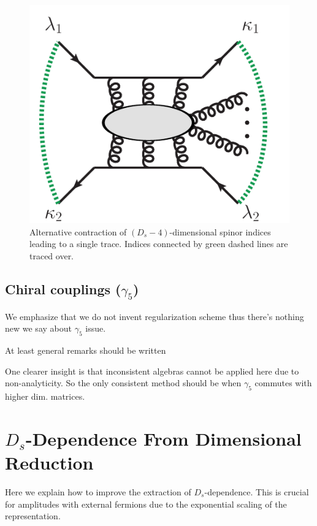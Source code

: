 \begin{figure}[]
  \begin{center}
  	\includegraphics[scale=0.5]
    {figures/singleTrace.pdf}
\end{center} 
\caption{Alternative contraction of $(D_s-4)$-dimensional spinor indices leading to a
single trace. Indices connected by green dashed lines are traced
over.}
\label{fig_SingleTrace}
\end{figure}





\subsection{Chiral couplings ($\gamma_5$)}


We emphasize that we do not invent regularization scheme thus there's nothing new we say about $\gamma_5$ issue.

At least general remarks should be written 

One clearer insight is that inconsistent algebras cannot be applied here due to non-analyticity.
So the only consistent method should be when $\gamma_5$ commutes with higher dim. matrices.



\section{$D_s$-Dependence From Dimensional Reduction}
\label{sec:ds_reduction}
Here we explain how to improve the extraction of $D_s$-dependence.
This is crucial for amplitudes with external fermions due to the exponential scaling of the representation.


